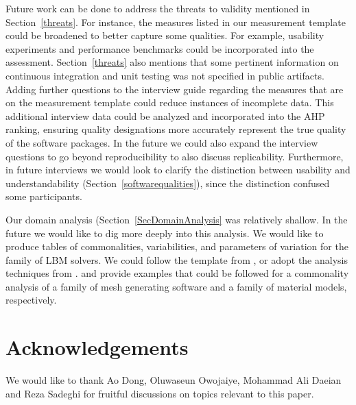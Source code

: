 \documentclass[final, 3p, times, authoryear]{elsarticle}
\begin{document}
Future work can be done to address the threats to validity mentioned in
Section~\ref{threats}.  For instance, the measures listed in our measurement
template could be broadened to better capture some qualities. For example,
usability experiments and performance benchmarks could be incorporated into the
assessment.  Section~\ref{threats} also mentions that some pertinent information
on continuous integration and unit testing was not specified in public
artifacts. Adding further questions to the interview guide regarding the
measures that are on the measurement template could reduce instances of
incomplete data. This additional interview data could be analyzed and
incorporated into the AHP ranking, ensuring quality designations more accurately
represent the true quality of the software packages. In the future we could also
expand the interview questions to go beyond reproducibility to also discuss
replicability. Furthermore, in future interviews we would look to clarify the
distinction between usability and understandability
(Section~\ref{softwarequalities}), since the distinction confused some
participants.

Our domain analysis (Section~\ref{SecDomainAnalysis} was relatively shallow.  In
the future we would like to dig more deeply into this analysis.  We would like
to produce tables of commonalities, variabilities, and parameters of variation
for the family of LBM solvers. We could follow the template from
\citep{smith2008commonality}, or adopt the analysis techniques from
\citep{weiss1998commonality}. \cite{SmithAndChen2004} and
\cite{SmithMcCutchanAndCarette2017} provide examples that could be followed for
a commonality analysis of a family of mesh generating software and a family of
material models, respectively.

\section*{Acknowledgements}

We would like to thank Ao Dong, Oluwaseun Owojaiye, Mohammad Ali Daeian and Reza
Sadeghi for fruitful discussions on topics relevant to this paper.



\end{document}
